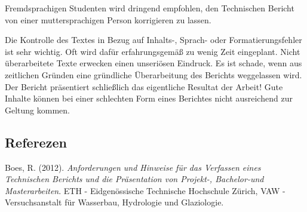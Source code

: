 \documentclass[
]{agujournal2019}
\newlength{\cslhangindent}
\newenvironment{CSLReferences}[2] %
 {\begin{list}{}{%
  \setlength{\itemindent}{0pt}
  \setlength{\leftmargin}{0pt}
  \setlength{\parsep}{0pt}
  \ifodd #1
   \setlength{\leftmargin}{\cslhangindent}
   \setlength{\itemindent}{-1\cslhangindent}
  \fi
  \setlength{\itemsep}{#2\baselineskip}}}
 {\end{list}}
\begin{document}
Fremdsprachigen Studenten wird dringend empfohlen, den Technischen
Bericht von einer muttersprachigen Person korrigieren zu lassen.

Die Kontrolle des Textes in Bezug auf Inhalts-, Sprach- oder
Formatierungsfehler ist sehr wichtig. Oft wird dafür erfahrungsgemäß zu
wenig Zeit eingeplant. Nicht überarbeitete Texte erwecken einen
unseriösen Eindruck. Es ist schade, wenn aus zeitlichen Gründen eine
gründliche Überarbeitung des Berichts weggelassen wird. Der Bericht
präsentiert schließlich das eigentliche Resultat der Arbeit! Gute
Inhalte können bei einer schlechten Form eines Berichtes nicht
ausreichend zur Geltung kommen.

\subsection*{Referezen}\label{referezen}

\label{refs}
\begin{CSLReferences}{1}{0}
\vspace{1em}

Boes, R. (2012). \emph{Anforderungen und {H}inweise für das {V}erfassen
eines {T}echnischen {B}erichts und die {P}räsentation von {P}rojekt-,
{B}achelor-und {M}asterarbeiten}. ETH - Eidgenössische Technische
Hochschule Zürich, VAW - Versuchsanstalt für Wasserbau, Hydrologie und
Glaziologie.

\end{CSLReferences}
\end{document}
